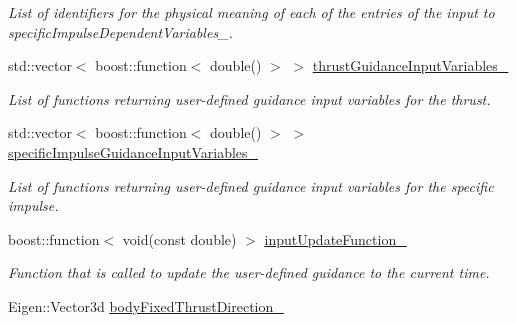 \begin{DoxyCompactItemize}
\begin{DoxyCompactList}\small\item\em List of identifiers for the physical meaning of each of the entries of the input to specific\+Impulse\+Dependent\+Variables\+\_\+. \end{DoxyCompactList}\item 
std\+::vector$<$ boost\+::function$<$ double() $>$ $>$ \hyperlink{classtudat_1_1simulation__setup_1_1ParameterizedThrustMagnitudeSettings_a210c06816c5605cb3397e2746f7bbda1}{thrust\+Guidance\+Input\+Variables\+\_\+}\hypertarget{classtudat_1_1simulation__setup_1_1ParameterizedThrustMagnitudeSettings_a210c06816c5605cb3397e2746f7bbda1}{}\label{classtudat_1_1simulation__setup_1_1ParameterizedThrustMagnitudeSettings_a210c06816c5605cb3397e2746f7bbda1}

\begin{DoxyCompactList}\small\item\em List of functions returning user-\/defined guidance input variables for the thrust. \end{DoxyCompactList}\item 
std\+::vector$<$ boost\+::function$<$ double() $>$ $>$ \hyperlink{classtudat_1_1simulation__setup_1_1ParameterizedThrustMagnitudeSettings_a6cc28fa5a19534fec6e7d2d1e39c366f}{specific\+Impulse\+Guidance\+Input\+Variables\+\_\+}\hypertarget{classtudat_1_1simulation__setup_1_1ParameterizedThrustMagnitudeSettings_a6cc28fa5a19534fec6e7d2d1e39c366f}{}\label{classtudat_1_1simulation__setup_1_1ParameterizedThrustMagnitudeSettings_a6cc28fa5a19534fec6e7d2d1e39c366f}

\begin{DoxyCompactList}\small\item\em List of functions returning user-\/defined guidance input variables for the specific impulse. \end{DoxyCompactList}\item 
boost\+::function$<$ void(const double) $>$ \hyperlink{classtudat_1_1simulation__setup_1_1ParameterizedThrustMagnitudeSettings_a29db6d8688c2fc65f9adb8a1ee18f40d}{input\+Update\+Function\+\_\+}\hypertarget{classtudat_1_1simulation__setup_1_1ParameterizedThrustMagnitudeSettings_a29db6d8688c2fc65f9adb8a1ee18f40d}{}\label{classtudat_1_1simulation__setup_1_1ParameterizedThrustMagnitudeSettings_a29db6d8688c2fc65f9adb8a1ee18f40d}

\begin{DoxyCompactList}\small\item\em Function that is called to update the user-\/defined guidance to the current time. \end{DoxyCompactList}\item 
Eigen\+::\+Vector3d \hyperlink{classtudat_1_1simulation__setup_1_1ParameterizedThrustMagnitudeSettings_a88c783a473370e5f5f12f34a0f4fe9ad}{body\+Fixed\+Thrust\+Direction\+\_\+}\hypertarget{classtudat_1_1simulation__setup_1_1ParameterizedThrustMagnitudeSettings_a88c783a473370e5f5f12f34a0f4fe9ad}{}\label{classtudat_1_1simulation__setup_1_1ParameterizedThrustMagnitudeSettings_a88c783a473370e5f5f12f34a0f4fe9ad}


\end{DoxyCompactItemize}
